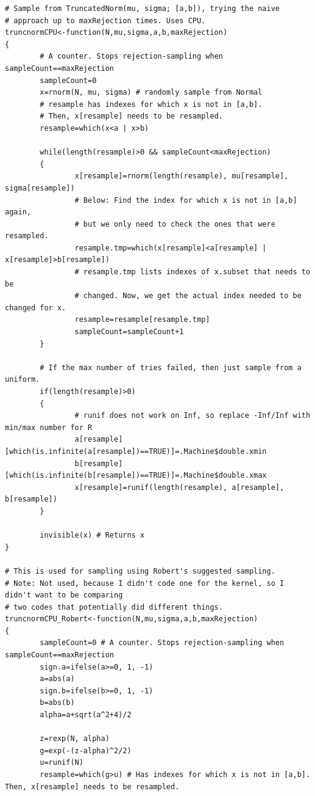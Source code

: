 \documentclass{article}
\begin{document}
\begin{verbatim}
# Sample from TruncatedNorm(mu, sigma; [a,b]), trying the naive
# approach up to maxRejection times. Uses CPU.
truncnormCPU<-function(N,mu,sigma,a,b,maxRejection)
{
        # A counter. Stops rejection-sampling when sampleCount==maxRejection
        sampleCount=0
        x=rnorm(N, mu, sigma) # randomly sample from Normal
        # resample has indexes for which x is not in [a,b].
        # Then, x[resample] needs to be resampled.
        resample=which(x<a | x>b)

        while(length(resample)>0 && sampleCount<maxRejection)
        {
                x[resample]=rnorm(length(resample), mu[resample], sigma[resample])
                # Below: Find the index for which x is not in [a,b] again,
                # but we only need to check the ones that were resampled.
                resample.tmp=which(x[resample]<a[resample] | x[resample]>b[resample])
                # resample.tmp lists indexes of x.subset that needs to be
                # changed. Now, we get the actual index needed to be changed for x.
                resample=resample[resample.tmp]
                sampleCount=sampleCount+1
        }

        # If the max number of tries failed, then just sample from a uniform.
        if(length(resample)>0)
        {
                # runif does not work on Inf, so replace -Inf/Inf with min/max number for R
                a[resample][which(is.infinite(a[resample])==TRUE)]=.Machine$double.xmin
                b[resample][which(is.infinite(b[resample])==TRUE)]=.Machine$double.xmax
                x[resample]=runif(length(resample), a[resample], b[resample])
        }

        invisible(x) # Returns x
}

# This is used for sampling using Robert's suggested sampling.
# Note: Not used, because I didn't code one for the kernel, so I didn't want to be comparing
# two codes that potentially did different things.
truncnormCPU_Robert<-function(N,mu,sigma,a,b,maxRejection)
{
        sampleCount=0 # A counter. Stops rejection-sampling when sampleCount==maxRejection
        sign.a=ifelse(a>=0, 1, -1)
        a=abs(a)
        sign.b=ifelse(b>=0, 1, -1)
        b=abs(b)
        alpha=a+sqrt(a^2+4)/2

        z=rexp(N, alpha)
        g=exp(-(z-alpha)^2/2)
        u=runif(N)
        resample=which(g>u) # Has indexes for which x is not in [a,b]. Then, x[resample] needs to be resampled.


\end{verbatim}
\end{document}

